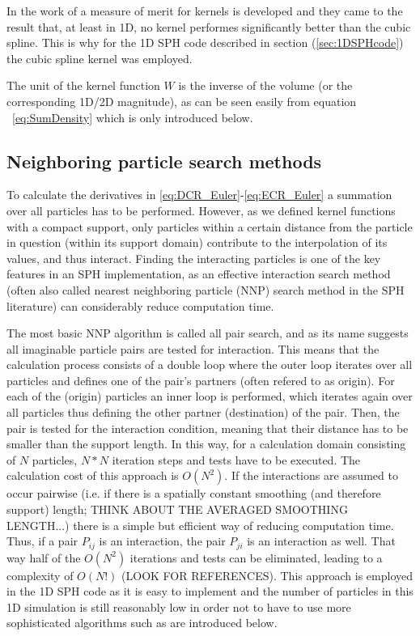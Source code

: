 \documentclass{report}
\begin{document}
In the work of \cite{Fulk1996} a measure of merit for kernels is developed and
they came to the result that, at least in 1D, no kernel performes significantly better
than the cubic spline.
This is why for the 1D SPH code described in section (\ref{sec:1DSPHcode}) the cubic
spline kernel was employed.

The unit of the kernel function $W$ is the inverse of the volume (or the corresponding 1D/2D magnitude), as can be seen easily from equation ~\ref{eq:SumDensity} which is only introduced below.


\subsection{Neighboring particle search methods}
\label{sec:NNPS}
To calculate the derivatives in \ref{eq:DCR_Euler}-\ref{eq:ECR_Euler} a
summation over all particles has to be performed. However, as we defined kernel
functions with a compact support, only particles within a certain distance from
the particle in question (within its support domain) contribute to the
interpolation of its values, and thus interact. Finding the interacting
particles is one of the key features in an SPH implementation, as an effective
interaction search method (often also called nearest neighboring particle (NNP)
search method in the SPH literature) can considerably reduce
computation time. 

The most basic NNP algorithm is called all pair search, and as its name
suggests all imaginable particle pairs are tested for interaction. This means
that the calculation process consists of a double loop where the outer loop
iterates over all particles and defines one of the pair's partners (often
refered to as origin). For each of the (origin) particles an inner loop is
performed, which iterates again over all particles thus defining the other
partner (destination) of the pair. Then, the pair is tested for the
interaction condition, meaning that their distance has to be smaller than the
support length. In this way, for a calculation domain consisting of $N$
particles, $N*N$ iteration steps and tests have to be executed. The
calculation cost of this approach is $O(N^2)$. 
If the
interactions are assumed to occur pairwise (i.e. if there is a spatially constant
smoothing (and therefore support) length; THINK ABOUT THE AVERAGED SMOOTHING
LENGTH...) there is a simple but efficient way of reducing computation
time. Thus, if a pair $P_{ij}$ is an interaction, the pair
$P_{ji}$ is an interaction as well. That way half of the $O(N^2)$ iterations
and tests can be eliminated, leading to a complexity of $O(N!)$ (LOOK FOR
REFERENCES). This approach is employed in the 1D SPH code as it is easy to
implement\cite{Liu2003} and the number of particles in this 1D simulation is
still reasonably low in order not to have to use more sophisticated algorithms
such as are introduced below.
\end{document}

